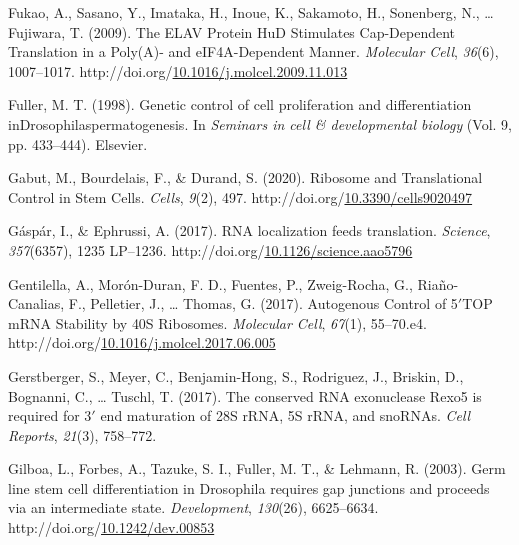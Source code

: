 \documentclass[12pt,oneside]{reedthesis}
\newlength{\cslhangindent}
\newenvironment{CSLReferences}[2] %
 {%
  \setlength{\parindent}{0pt}
  \ifodd #1 \everypar{\setlength{\hangindent}{\cslhangindent}}\ignorespaces\fi
  \ifnum #2 > 0
  \setlength{\parskip}{#2\baselineskip}
  \fi
 }%
 {}
\begin{document}
\begin{CSLReferences}{1}{0}
\leavevmode{}%
Fukao, A., Sasano, Y., Imataka, H., Inoue, K., Sakamoto, H., Sonenberg, N., \ldots{} Fujiwara, T. (2009). The {ELAV Protein HuD Stimulates Cap}-{Dependent Translation} in a {Poly}({A})- and {eIF4A}-{Dependent Manner}. \emph{Molecular Cell}, \emph{36}(6), 1007--1017. http://doi.org/\href{https://doi.org/10.1016/j.molcel.2009.11.013}{10.1016/j.molcel.2009.11.013}

\leavevmode{}%
Fuller, M. T. (1998). Genetic control of cell proliferation and differentiation {inDrosophilaspermatogenesis}. In \emph{Seminars in cell \& developmental biology} (Vol. 9, pp. 433--444). {Elsevier}.

\leavevmode{}%
Gabut, M., Bourdelais, F., \& Durand, S. (2020). Ribosome and {Translational Control} in {Stem Cells}. \emph{Cells}, \emph{9}(2), 497. http://doi.org/\href{https://doi.org/10.3390/cells9020497}{10.3390/cells9020497}

\leavevmode{}%
Gáspár, I., \& Ephrussi, A. (2017). {RNA} localization feeds translation. \emph{Science}, \emph{357}(6357), 1235 LP--1236. http://doi.org/\href{https://doi.org/10.1126/science.aao5796}{10.1126/science.aao5796}

\leavevmode{}%
Gentilella, A., Morón-Duran, F. D., Fuentes, P., Zweig-Rocha, G., Riaño-Canalias, F., Pelletier, J., \ldots{} Thomas, G. (2017). Autogenous {Control} of 5{\({'}\)}{TOP mRNA Stability} by {40S Ribosomes}. \emph{Molecular Cell}, \emph{67}(1), 55--70.e4. http://doi.org/\href{https://doi.org/10.1016/j.molcel.2017.06.005}{10.1016/j.molcel.2017.06.005}

\leavevmode{}%
Gerstberger, S., Meyer, C., Benjamin-Hong, S., Rodriguez, J., Briskin, D., Bognanni, C., \ldots{} Tuschl, T. (2017). The conserved {RNA} exonuclease {Rexo5} is required for 3{\({'}\)} end maturation of {28S rRNA}, {5S rRNA}, and {snoRNAs}. \emph{Cell Reports}, \emph{21}(3), 758--772.

\leavevmode{}%
Gilboa, L., Forbes, A., Tazuke, S. I., Fuller, M. T., \& Lehmann, R. (2003). Germ line stem cell differentiation in {Drosophila} requires gap junctions and proceeds via an intermediate state. \emph{Development}, \emph{130}(26), 6625--6634. http://doi.org/\href{https://doi.org/10.1242/dev.00853}{10.1242/dev.00853}


\end{CSLReferences}
\end{document}
